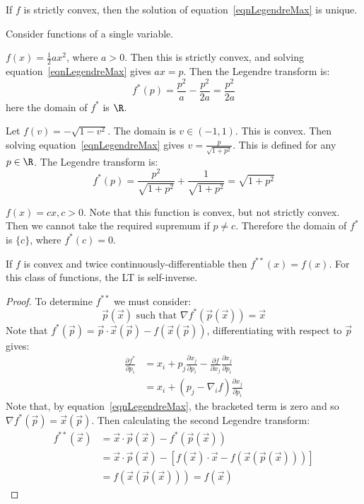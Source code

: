 \documentclass[../Main.tex]{subfiles}
\begin{document}
\begin{remark}
    If $f$ is strictly convex, then the solution of equation~\ref{eqnLegendreMax} is unique.
\end{remark}
\begin{examples}{
        Consider functions of a single variable.
    }
    \item $f(x) = \frac{1}{2} ax^2$, where $a > 0$. Then this is strictly convex, and solving equation~\ref{eqnLegendreMax} gives $ax = p$. Then the Legendre transform is:
        \begin{equation*}
            f^*(p) = \frac{p^2}{a} - \frac{p^2}{2a} = \frac{p^2}{2a}
        \end{equation*}
        here the domain of $f^*$ is $\R$.
    \item Let $f(v) = -\sqrt{1 - v^2}$. The domain is $v \in (-1, 1)$. This is convex. Then solving equation~\ref{eqnLegendreMax} gives $v = \frac{p}{\sqrt{1 + p^2}}$. This is defined for any $p \in \R$. The Legendre transform is:
        \begin{equation*}
            f^*(p) = \frac{p^2}{\sqrt{1 + p^2}} + \frac{1}{\sqrt{1 + p^2}} = \sqrt{1 + p^2}
        \end{equation*}
    \item $f(x) = cx, c > 0$. Note that this function is convex, but not strictly convex. Then we cannot take the required supremum if $p \neq c$. Therefore the domain of $f^*$ is $\{c\}$, where $f^*(c) = 0$. \label{exLineLT}
\end{examples}
\begin{theorem}
    If $f$ is convex and twice continuously-differentiable then $f^{**}(x) = f(x)$. For this class of functions, the LT is self-inverse.
\end{theorem}
\begin{proof}
    To determine $f^{**}$ we must consider:
    \begin{equation*}
        \vec{p}(\vec{x}) \text{ such that } \nabla f^*(\vec{p}(\vec{x})) = \vec{x}
    \end{equation*}
    Note that $f^*(\vec{p}) = \vec{p} \cdot \vec{x}(\vec{p}) - f(\vec{x}(\vec{p}))$, differentiating with respect to $\vec{p}$ gives:
    \begin{align*}
        \frac{\partial f^*}{\partial p_i} &= x_i + p_j \frac{\partial x_j}{\partial p_i} - \frac{\partial f}{\partial x_j} \frac{\partial x_j}{\partial p_i} \\
        &= x_i + \left(p_j - \nabla_i f\right) \frac{\partial x_j}{\partial p_i}
    \end{align*}
    Note that, by equation~\ref{eqnLegendreMax}, the bracketed term is zero and so $\nabla f^*(\vec{p}) = \vec{x}(\vec{p})$. Then calculating the second Legendre transform:
    \begin{align*}
        f^{**}(\vec{x}) &= \vec{x} \cdot \vec{p}(\vec{x}) - f^*(\vec{p}(\vec{x})) \\
        &= \vec{x} \cdot \vec{p}(\vec{x}) - \left[f(\vec{x}) \cdot \vec{x} - f(\vec{x}(\vec{p}(\vec{x})))\right] \\
        &= f(\vec{x}(\vec{p}(\vec{x}))) = f(\vec{x})
    \end{align*}
\end{proof}
\end{document}
